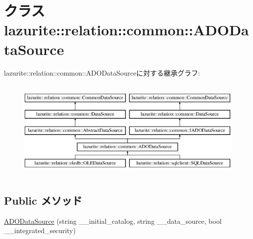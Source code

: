 \hypertarget{classlazurite_1_1relation_1_1common_1_1_a_d_o_data_source}{
\section{クラス lazurite::relation::common::ADODataSource}
\label{classlazurite_1_1relation_1_1common_1_1_a_d_o_data_source}
}
lazurite::relation::common::ADODataSourceに対する継承グラフ:\begin{figure}[H]
\begin{center}
\leavevmode
\includegraphics[height=4.96454cm]{classlazurite_1_1relation_1_1common_1_1_a_d_o_data_source}
\end{center}
\end{figure}
\subsection*{Public メソッド}
\begin{DoxyCompactItemize}
\item 
\hyperlink{classlazurite_1_1relation_1_1common_1_1_a_d_o_data_source_ac0e205ee3f2798c66849ce140b9869cc}{ADODataSource} (string \_\-\_\-initial\_\-catalog, string \_\-\_\-data\_\-source, bool \_\-\_\-integrated\_\-security)
\end{DoxyCompactItemize}
